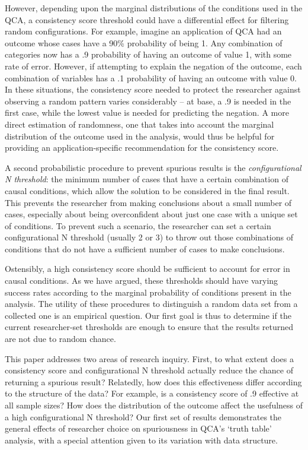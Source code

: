 \documentclass[12pt]{article}
\begin{document}
{However, depending upon the marginal distributions of the conditions used in the QCA, a consistency score threshold could have a differential effect for filtering random configurations. For example, imagine an application of QCA had an outcome whose cases have a 90\% probability of being 1. Any combination of categories now has a .9 probability of having an outcome of value 1, with some rate of error. However, if attempting to explain the negation of the outcome, each combination of variables has a .1 probability of having an outcome with value 0. In these situations, the consistency score needed to protect the researcher against observing a random pattern varies considerably -- at base, a .9 is needed in the first case, while the lowest value is needed for predicting the negation. A more direct estimation of randomness, one that takes into account the marginal distribution of the outcome used in the analysis, would thus be helpful for providing an application-specific recommendation for the consistency score. 

A second probabilistic procedure to prevent spurious results is the {\it{configurational N threshold}}:  the minimum number of cases that have a certain combination of causal conditions, which allow the solution to be considered in the final result. This prevents the researcher from making conclusions about a small number of cases, especially about being overconfident about just one case with a unique set of conditions. To prevent such a scenario, the researcher can set a certain configurational N threshold (usually 2 or 3) to throw out those combinations of conditions that do not have a sufficient number of cases to make conclusions. 

Ostensibly, a high consistency score should be sufficient to account for error in causal conditions. As we have argued, these thresholds should have varying success rates according to the marginal probability of conditions present in the analysis. The utility of these procedures to distinguish a random data set from a collected one is an empirical question. Our first goal is thus to determine if the current researcher-set thresholds are enough to ensure that the results returned are not due to random chance. 

This paper addresses two areas of research inquiry. First, to what extent does a consistency score and configurational N threshold actually reduce the chance of returning a spurious result? Relatedly, how does this effectiveness differ according to the structure of the data? For example, is a consistency score of .9 effective at all sample sizes? How does the distribution of the outcome affect the usefulness of a high configurational N threshold? Our first set of results demonstrates the general effects of researcher choice on spuriousness in QCA's `truth table' analysis, with a special attention given to its variation with data structure. 

}
\end{document}
